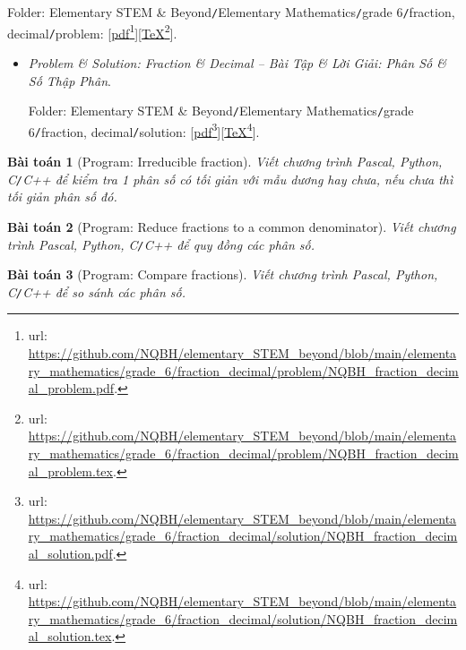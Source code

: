 \documentclass[12pt]{article}
\newtheorem{baitoan}{Bài toán}
\begin{document}
\begin{enumerate}
	Folder: {\sf Elementary STEM \& Beyond{\tt/}Elementary Mathematics{\tt/}grade 6{\tt/}fraction, decimal{\tt/}problem}: [\href{https://github.com/NQBH/elementary_STEM_beyond/blob/main/elementary_mathematics/grade_6/fraction_decimal/problem/NQBH_fraction_decimal_problem.pdf}{pdf}\footnote{{\sc url}: \url{https://github.com/NQBH/elementary_STEM_beyond/blob/main/elementary_mathematics/grade_6/fraction_decimal/problem/NQBH_fraction_decimal_problem.pdf}.}][\href{https://github.com/NQBH/elementary_STEM_beyond/blob/main/elementary_mathematics/grade_6/fraction_decimal/problem/NQBH_fraction_decimal_problem.tex}{\TeX}\footnote{{\sc url}: \url{https://github.com/NQBH/elementary_STEM_beyond/blob/main/elementary_mathematics/grade_6/fraction_decimal/problem/NQBH_fraction_decimal_problem.tex}.}].
	\begin{itemize}
		\item {\it Problem \& Solution: Fraction \& Decimal -- Bài Tập \& Lời Giải: Phân Số {\it\&} Số Thập Phân}.
		
		Folder: {\sf Elementary STEM \& Beyond{\tt/}Elementary Mathematics{\tt/}grade 6{\tt/}fraction, decimal{\tt/}solution}: [\href{https://github.com/NQBH/elementary_STEM_beyond/blob/main/elementary_mathematics/grade_6/fraction_decimal/solution/NQBH_fraction_decimal_solution.pdf}{pdf}\footnote{{\sc url}: \url{https://github.com/NQBH/elementary_STEM_beyond/blob/main/elementary_mathematics/grade_6/fraction_decimal/solution/NQBH_fraction_decimal_solution.pdf}.}][\href{https://github.com/NQBH/elementary_STEM_beyond/blob/main/elementary_mathematics/grade_6/fraction_decimal/solution/NQBH_fraction_decimal_solution.tex}{\TeX}\footnote{{\sc url}: \url{https://github.com/NQBH/elementary_STEM_beyond/blob/main/elementary_mathematics/grade_6/fraction_decimal/solution/NQBH_fraction_decimal_solution.tex}.}].
	\end{itemize}
	\begin{baitoan}[{\sf Program}: Irreducible fraction]
		Viết chương trình {\sf Pascal, Python, C{\tt/}C++} để kiểm tra 1 phân số có tối giản với mẫu dương hay chưa, nếu chưa thì tối giản phân số đó.
	\end{baitoan}
	
	\begin{baitoan}[{\sf Program}: Reduce fractions to a common denominator]
		Viết chương trình {\sf Pascal, Python, C{\tt/}C++} để quy đồng các phân số.
	\end{baitoan}
	
	\begin{baitoan}[{\sf Program}: Compare fractions]
		Viết chương trình {\sf Pascal, Python, C{\tt/}C++} để so sánh các phân số.
	\end{baitoan}
	

\end{enumerate}
\end{document}

